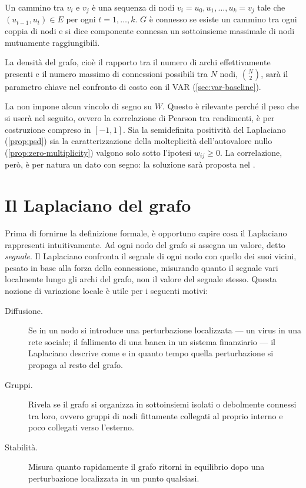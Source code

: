 Un cammino tra $v_i$ e $v_j$ è una sequenza di nodi $v_i = u_0, u_1, \dots, u_k = v_j$ tale che $(u_{t-1}, u_t) \in E$ per ogni $t = 1, \dots, k$. $G$ è connesso se esiste un cammino tra ogni coppia di nodi e si dice componente connessa un sottoinsieme massimale di nodi mutuamente raggiungibili.

La densità del grafo, cioè il rapporto tra il numero di archi effettivamente presenti e il numero massimo di connessioni possibili tra $N$ nodi, $\binom{N}{2}$, sarà il parametro chiave nel confronto di costo con il VAR (\cref{sec:var-baseline}).

\begin{remark}
\label{rem:negative-weights}
La  non impone alcun vincolo di segno su $W$. Questo è rilevante perché il peso che si userà nel seguito, ovvero la correlazione di Pearson tra rendimenti, è per costruzione compreso in $[-1,1]$. Sia la semidefinita positività del Laplaciano (\cref{prop:psd}) sia la caratterizzazione della molteplicità dell'autovalore nullo (\cref{prop:zero-multiplicity}) valgono solo sotto l'ipotesi $w_{ij}\geq 0$. La correlazione, però, è per natura un dato con segno: la soluzione sarà proposta nel .
\end{remark}

\section{Il Laplaciano del grafo}
\label{sec:graph-laplacian}

Prima di fornirne la definizione formale, è opportuno capire cosa il Laplaciano rappresenti intuitivamente. Ad ogni nodo del grafo si assegna un valore, detto \emph{segnale}. Il Laplaciano confronta il segnale di ogni nodo con quello dei suoi vicini, pesato in base alla forza della connessione, misurando quanto il segnale vari localmente lungo gli archi del grafo, non il valore del segnale stesso. Questa nozione di variazione locale è utile per i seguenti motivi:

\begin{description}
    \item[Diffusione.] Se in un nodo si introduce una perturbazione localizzata — un virus in una rete sociale; il fallimento di una banca in un sistema finanziario — il Laplaciano descrive come e in quanto tempo quella perturbazione si propaga al resto del grafo.
    \item[Gruppi.] Rivela se il grafo si organizza in sottoinsiemi isolati o debolmente connessi tra loro, ovvero gruppi di nodi fittamente collegati al proprio interno e poco collegati verso l'esterno.
    \item[Stabilità.] Misura quanto rapidamente il grafo ritorni in equilibrio dopo una perturbazione localizzata in un punto qualsiasi.
\end{description}

